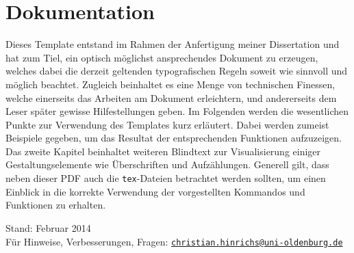 %
\ifx\fulldocument\undefined
  
  \pagestyle{scrheadings}                                                       %
\fi
%
%
%
\chapter{Dokumentation}\label{sec:dokumentation}
%
Dieses Template entstand im Rahmen der Anfertigung meiner Dissertation \cite{Hinrichs2014} und hat zum Tiel, ein optisch möglichst ansprechendes Dokument zu erzeugen, welches dabei die derzeit geltenden typografischen Regeln soweit wie sinnvoll und möglich beachtet. Zugleich beinhaltet es eine Menge von technischen Finessen, welche einerseits das Arbeiten am Dokument erleichtern, und andererseits dem Leser später gewisse Hilfestellungen geben. Im Folgenden werden die wesentlichen Punkte zur Verwendung des Templates kurz erläutert. Dabei werden zumeist Beispiele gegeben, um das Resultat der entsprechenden Funktionen aufzuzeigen. Das zweite Kapitel beinhaltet weiteren Blindtext zur Visualisierung einiger Gestaltungselemente wie Überschriften und Aufzählungen. Generell gilt, dass neben dieser PDF auch die \texttt{tex}-Dateien betrachtet werden sollten, um einen Einblick in die korrekte Verwendung der vorgestellten Kommandos und Funktionen zu erhalten.
%
\\\par\noindent Stand: Februar 2014\\
Für Hinweise, Verbesserungen, Fragen: \href{mailto:christian.hinrichs@uni-oldenburg.de}{\nolinkurl{christian.hinrichs@uni-oldenburg.de}}
%
